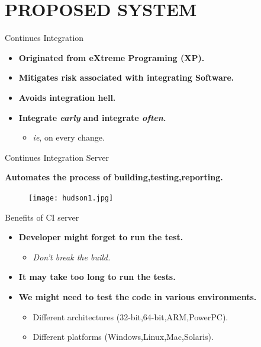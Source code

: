 \documentclass{beamer}
\begin{document}
\section{PROPOSED SYSTEM}  

\begin{frame}{Continues Integration}
\vspace{0.5cm}
 \begin{itemize}
\item \textbf{Originated from eXtreme Programing (XP).}
\vspace{.5 cm}
\item \textbf{Mitigates risk associated with integrating Software.} 
\vspace{.5 cm}
\item\textbf{Avoids integration hell.}

\vspace{.5 cm}
\item \textbf{Integrate \textit{early} and integrate \textit{often}.}
\vspace{.5 cm}
 \begin{itemize}
\item \textit{ie}, on every change.
\end{itemize}
\end{itemize}
\end{frame}  

\begin{frame}{Continues Integration Server}

 \textbf {Automates the process of building,testing,reporting.}
\begin{figure}
\begin{center}
\texttt{[image: hudson1.jpg]}
\end{center}
\end{figure}
\end{frame}

\begin{frame}{Benefits of CI server}
\vspace{0.5cm}
 \begin{itemize}
\item \textbf{Developer might forget to run the test.}
\begin{itemize}
\vspace{0.5cm}
\item \textit{Don't break the build.}
\end{itemize}
\vspace{0.5cm}
\item \textbf{It may take too long to run the tests.}
\vspace{0.5cm}
\item \textbf{We might need to test the code in various environments.} 
\vspace{0.5cm}
\begin{itemize}
\item Different architectures (32-bit,64-bit,ARM,PowerPC).
\vspace{0.5cm}
\item Different platforms (Windows,Linux,Mac,Solaris).
\end{itemize}
\end{itemize}
\end{frame} 
\end{document}

